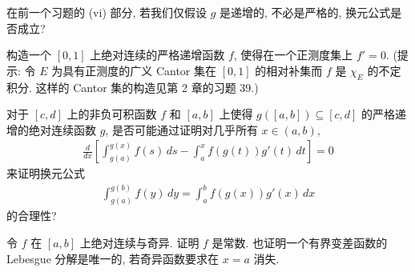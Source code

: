 \documentclass[../../main.tex]{subfiles}
\begin{document}
\begin{exercise}\label{exercise:ch06-57}
在前一个习题的 (vi) 部分, 若我们仅假设 $g$ 是递增的, 不必是严格的, 换元公式是否成立?
\end{exercise}

\begin{exercise}\label{exercise:ch06-58}
构造一个 $[0,1]$ 上绝对连续的严格递增函数 $f$, 使得在一个正测度集上 $f'=0$. (提示: 令 $E$ 为具有正测度的广义 Cantor 集在 $[0,1]$ 的相对补集而 $f$ 是 $\chi_{E}$ 的不定积分. 这样的 Cantor 集的构造见第 2 章的习题 39.)
\end{exercise}

\begin{exercise}\label{exercise:ch06-59}
对于 $[c,d]$ 上的非负可积函数 $f$ 和 $[a,b]$ 上使得 $g([a,b])\subseteq[c,d]$ 的严格递增的绝对连续函数 $g$, 是否可能通过证明对几乎所有 $x\in(a,b)$,
\begin{align*}
\frac{d}{dx}\left[\int_{g(a)}^{g(x)}f(s)\,ds-\int_{a}^{x}f(g(t))g'(t)\,dt\right]=0
\end{align*}
来证明换元公式
\begin{align*}
\int_{g(a)}^{g(b)}f(y)\,dy=\int_{a}^{b}f(g(x))g'(x)\,dx
\end{align*}
的合理性?
\end{exercise}

\begin{exercise}\label{exercise:ch06-60}
令 $f$ 在 $[a,b]$ 上绝对连续与奇异. 证明 $f$ 是常数. 也证明一个有界变差函数的 Lebesgue 分解是唯一的, 若奇异函数要求在 $x=a$ 消失.
\end{exercise}
\end{document}
